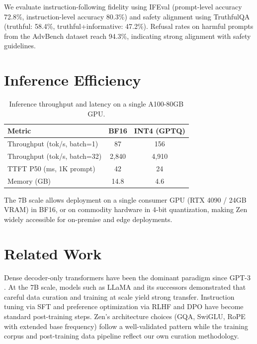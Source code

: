 \documentclass[11pt,a4paper]{article}
\begin{document}
We evaluate instruction-following fidelity using IFEval \cite{zhou2023ifeval} (prompt-level
accuracy 72.8\%, instruction-level accuracy 80.3\%) and safety alignment using TruthfulQA
\cite{lin2022truthfulqa} (truthful: 58.4\%, truthful+informative: 47.2\%). Refusal rates on
harmful prompts from the AdvBench dataset reach 94.3\%, indicating strong alignment with safety
guidelines.

\section{Inference Efficiency}

\begin{table}[H]
\centering
\caption{Inference throughput and latency on a single A100-80GB GPU.}
\label{tab:inference}
\begin{tabular}{lcc}
\toprule
\textbf{Metric} & \textbf{BF16} & \textbf{INT4 (GPTQ)} \\
\midrule
Throughput (tok/s, batch=1)   & 87  & 156 \\
Throughput (tok/s, batch=32)  & 2{,}840 & 4{,}910 \\
TTFT P50 (ms, 1K prompt)      & 42  & 24 \\
Memory (GB)                   & 14.8 & 4.6 \\
\bottomrule
\end{tabular}
\end{table}

The 7B scale allows deployment on a single consumer GPU (RTX 4090 / 24GB VRAM) in BF16, or on
commodity hardware in 4-bit quantization, making Zen widely accessible for on-premise and
edge deployments.

\section{Related Work}

Dense decoder-only transformers have been the dominant paradigm since GPT-3 \cite{brown2020gpt3}.
At the 7B scale, models such as LLaMA \cite{touvron2023llama} and its successors demonstrated
that careful data curation and training at scale yield strong transfer. Instruction tuning via SFT
\cite{wei2022finetuned} and preference optimization via RLHF \cite{ouyang2022instructgpt} and
DPO \cite{rafailov2023dpo} have become standard post-training steps. Zen's architecture choices
(GQA, SwiGLU, RoPE with extended base frequency) follow a well-validated pattern while the
training corpus and post-training data pipeline reflect our own curation methodology.
\end{document}
